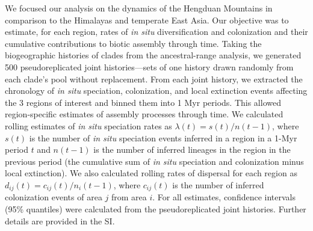 We focused our analysis on the dynamics of the Hengduan Mountains in comparison to the Himalayas and temperate East Asia. Our objective was to estimate, for each region, rates of \textit{in situ} diversification and colonization and their cumulative contributions to biotic assembly through time. Taking the biogeographic histories of clades from the ancestral-range analysis, we generated 500 pseudoreplicated joint histories---sets of one history drawn randomly from each clade's pool without replacement. From each joint history, we extracted the chronology of \textit{in situ} speciation, colonization, and local extinction events affecting the 3 regions of interest and binned them into 1 Myr periods. This allowed region-specific estimates of assembly processes through time. We calculated rolling estimates of \textit{in situ} speciation rates as $\lambda(t) = s(t)/n(t-1)$, where $s(t)$ is the number of \textit{in situ} speciation events inferred in a region in a 1-Myr period $t$ and $n(t-1)$ is the number of inferred lineages in the region in the previous period (the cumulative sum of \textit{in situ} speciation and colonization minus local extinction). We also calculated rolling rates of dispersal for each region as $d_{ij}(t) = c_{ij}(t)/n_i(t-1)$, where $c_{ij}(t)$ is the number of inferred colonization events of area $j$ from area $i$. For all estimates, confidence intervals (95\% quantiles) were calculated from the pseudoreplicated joint histories. Further details are provided in the SI.